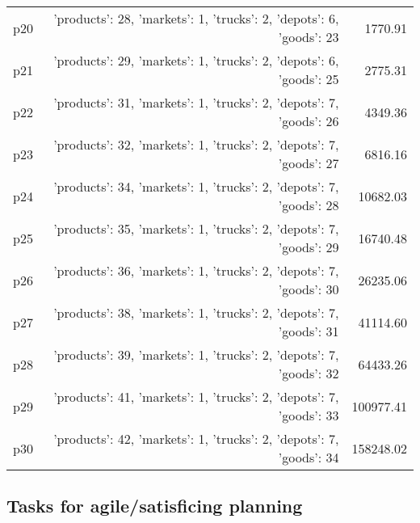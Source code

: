 \documentclass{article}
\begin{document}
\begin{center}
\begin{tabular}{@{}l|r|r@{}}
  p20&{'products': 28, 'markets': 1, 'trucks': 2, 'depots': 6, 'goods': 23}&1770.91\\
  p21&{'products': 29, 'markets': 1, 'trucks': 2, 'depots': 6, 'goods': 25}&2775.31\\
  p22&{'products': 31, 'markets': 1, 'trucks': 2, 'depots': 7, 'goods': 26}&4349.36\\
  p23&{'products': 32, 'markets': 1, 'trucks': 2, 'depots': 7, 'goods': 27}&6816.16\\
  p24&{'products': 34, 'markets': 1, 'trucks': 2, 'depots': 7, 'goods': 28}&10682.03\\
  p25&{'products': 35, 'markets': 1, 'trucks': 2, 'depots': 7, 'goods': 29}&16740.48\\
  p26&{'products': 36, 'markets': 1, 'trucks': 2, 'depots': 7, 'goods': 30}&26235.06\\
  p27&{'products': 38, 'markets': 1, 'trucks': 2, 'depots': 7, 'goods': 31}&41114.60\\
  p28&{'products': 39, 'markets': 1, 'trucks': 2, 'depots': 7, 'goods': 32}&64433.26\\
  p29&{'products': 41, 'markets': 1, 'trucks': 2, 'depots': 7, 'goods': 33}&100977.41\\
  p30&{'products': 42, 'markets': 1, 'trucks': 2, 'depots': 7, 'goods': 34}&158248.02
                            \end{tabular}
                            \end{center}
                    

                                \subsection*{Tasks for agile/satisficing planning}
                                
\end{document}
